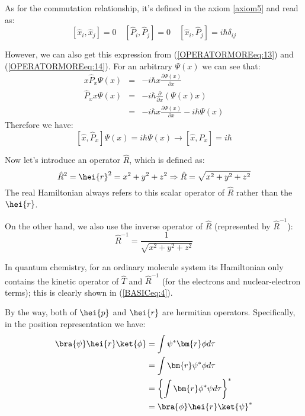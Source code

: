 As for the commutation relationship, it's defined in the axiom
\ref{axiom5} and read as:
\begin{equation}\label{OPERATORMOREeq:12}
[\hat{x}_{i}, \hat{x}_{j}] = 0 \quad [\hat{P}_{i}, \hat{P}_{j}] = 0
\quad [\hat{x}_{i}, \hat{P}_{j}] = i\hbar\delta_{ij}
\end{equation}

However, we can also get this expression from
(\ref{OPERATORMOREeq:13}) and (\ref{OPERATORMOREeq:14}). For an
arbitrary $\Psi(x)$ we can see that:
\begin{eqnarray}
  x\hat{P}_{x}\Psi(x) &=& -i\hbar x\frac{\partial\Psi(x)}{\partial x} \nonumber \\
  \hat{P}_{x}x\Psi(x) &=& -i\hbar\frac{\partial}{\partial x}(\Psi(x) x) \nonumber \\
                   &=& -i\hbar x\frac{\partial\Psi(x)}{\partial x}
                   -i\hbar\Psi(x)
\end{eqnarray}
Therefore we have:
\begin{equation}\label{}
[\hat{x}, \hat{P}_{x}]\Psi(x) = i\hbar\Psi(x) \rightarrow [\hat{x},
\hat{P}_{x}] = i\hbar
\end{equation}

Now let's introduce an operator $\hat{R}$, which is defined as:
\begin{equation}\label{}
\hat{R}^{2} = \hei{r}^{2} = x^{2} + y^{2} + z^{2} \Rightarrow
\hat{R} = \sqrt{x^{2} + y^{2} + z^{2}}
\end{equation}
The real Hamiltonian always refers to this scalar operator of
$\hat{R}$ rather than the $\hei{r}$.

On the other hand, we also use the inverse operator of $\hat{R}$
(represented by $\hat{R}^{-1}$):
\begin{equation}\label{}
\hat{R}^{-1} = \frac{1}{\sqrt{x^{2} + y^{2} + z^{2}}}
\end{equation}

In quantum chemistry, for an ordinary molecule system its
Hamiltonian only contains the kinetic operator of $\hat{T}$ and
$\hat{R}^{-1}$ (for the electrons and nuclear-electron terms); this
is clearly shown in (\ref{BASICeq:4}).

By the way, both of $\hei{p}$ and $\hei{r}$ are hermitian operators.
Specifically, in the position representation we have:
\begin{align}\label{OPERATORMOREeq:1}
\bra{\psi}\hei{r}\ket{\phi} &= \int\psi^{*}\bm{r}\phi d\tau   \nonumber \\
&= \int\bm{r}\psi^{*}\phi d\tau   \nonumber \\
&= \left\{\int\bm{r}\phi^{*}\psi d\tau \right \}^{*}   \nonumber \\
&= \bra{\phi}\hei{r}\ket{\psi}^{*}
\end{align}

